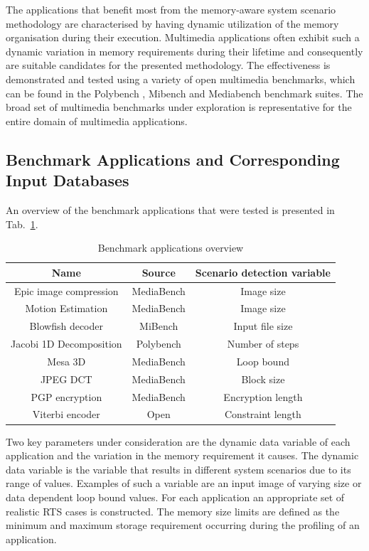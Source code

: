 The applications that benefit most from the memory-aware system scenario methodology are characterised by having dynamic utilization of the memory organisation during their execution. 
Multimedia applications often exhibit such a dynamic variation in memory requirements during their lifetime and consequently are suitable candidates for the presented methodology.
The effectiveness is demonstrated and tested using a variety of open multimedia benchmarks, which can be found in the Polybench \cite{Poly}, Mibench \cite{mibench} and Mediabench \cite{mediabench} benchmark suites.
The broad set of multimedia benchmarks under exploration is representative for the entire domain of multimedia applications. 

\subsection{Benchmark Applications and Corresponding Input Databases}

An overview of the benchmark applications that were tested is presented in Tab.~\ref{tab:app1}. 

\begin{table}
\caption{Benchmark applications overview}
\label{tab:app1}
{
\begin{tabular}{|c|c|c|}
\hline
\textbf{Name} & \textbf{Source} & \textbf{Scenario detection variable}\\ 
\hline 
Epic image compression & MediaBench & Image size \\ 
\hline 
Motion Estimation & MediaBench 	& Image size \\ 
\hline 
Blowfish decoder & MiBench & Input file size \\ 
\hline 
Jacobi 1D Decomposition & Polybench & Number of steps \\ 
\hline 
Mesa 3D & MediaBench & Loop bound \\ 
\hline 
JPEG DCT & MediaBench & Block size \\ 
\hline 
PGP encryption & MediaBench & Encryption length \\ 
\hline 
Viterbi encoder & Open & Constraint length \\ 
\hline 
\end{tabular}}
\end{table}

Two key parameters under consideration are the dynamic data variable of each application and the variation in the memory requirement it causes. 
The dynamic data variable is the variable that results in different system scenarios due to its range of values. 
Examples of such a variable are an input image of varying size or data dependent loop bound values. 
For each application an appropriate set of realistic RTS cases is constructed. 
The memory size limits are defined as the minimum and maximum storage requirement occurring during the profiling of an application.

